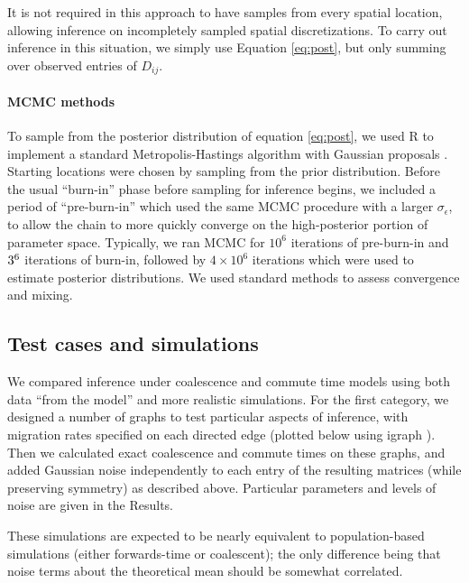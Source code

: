 \documentclass{article}
\begin{document}
It is not required in this approach to have samples from every spatial location,
allowing inference on incompletely sampled spatial discretizations.
To carry out inference in this situation,
we simply use Equation \ref{eq:post},
but only summing over observed entries of $D_{ij}$.

\paragraph{MCMC methods}
To sample from the posterior distribution of equation \eqref{eq:post}, 
we used R \citep{R} 
to implement a standard Metropolis-Hastings algorithm with Gaussian proposals \citep{brooks2011handbook}.
Starting locations were chosen by sampling from the prior distribution.
Before the usual ``burn-in'' phase before sampling for inference begins,
we included a period of ``pre-burn-in'' which used the same MCMC procedure
with a larger $\sigma_\epsilon$, to allow the chain to more quickly converge on the high-posterior
portion of parameter space.
Typically, we ran MCMC for $10^6$ iterations of pre-burn-in 
and $3 \time 10^6$ iterations of burn-in,
followed by $4 \times 10^6$ iterations which were used to estimate posterior distributions.
We used standard methods to assess convergence and mixing.


\subsection*{Test cases and simulations}

We compared inference under coalescence and commute time models
using both data ``from the model'' and more realistic simulations.
For the first category, we designed a number of graphs to test particular aspects of inference,
with migration rates specified on each directed edge
(plotted below using igraph \citep{igraph}).
Then we calculated exact coalescence and commute times on these graphs,
and added Gaussian noise independently to each entry of the resulting matrices
(while preserving symmetry)
as described above.
Particular parameters and levels of noise are given in the Results.

These simulations are expected to be nearly equivalent to population-based simulations
(either forwards-time or coalescent);
the only difference being that noise terms about the theoretical mean should be somewhat correlated.
\end{document}
